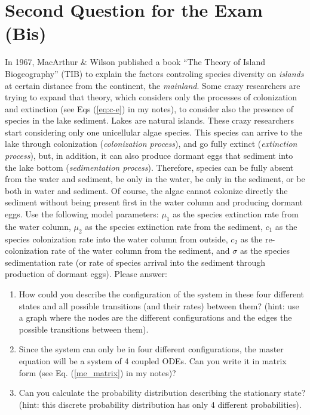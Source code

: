 \documentclass{article}
\begin{document}
\section{Second Question for the Exam (Bis)}
In 1967, MacArthur \& Wilson published a book ``The Theory of Island Biogeography'' (TIB) to explain the factors controling species diversity on {\em islands} at certain distance from the continent, the {\em mainland}. Some crazy researchers are trying to expand that theory, which considers only the processes of colonization and extinction (see Eqs (\ref{eq:c-e}) in my notes), to consider also the presence of species in the lake sediment. Lakes are natural islands. These crazy researchers start considering only one  unicellular algae species. This species can arrive to the lake through colonization (\textit{colonization process}), and go fully extinct (\textit{extinction process}), but, in addition, it can also produce dormant eggs that sediment into the lake bottom (\textit{sedimentation process}). Therefore, species can be fully absent from the water and sediment, be only in the water, be only in the sediment, or be both in water and sediment. Of course, the algae cannot colonize directly the sediment without being present first in the water column and producing dormant eggs. Use the following model parameters: $\mu_1$ as the species extinction rate from the water column, $\mu_2$ as the species extinction rate from the sediment, $c_1$ as the species colonization rate into the water column from outside, $c_2$ as the re-colonization rate of the water column from the sediment, and $\sigma$ as the species sedimentation rate (or rate of species arrival into the sediment through production of dormant eggs). Please answer: 

\begin{enumerate}
	\item How could you describe the configuration of the system in these four different states and all possible transitions (and their rates) between them? (hint: use a graph where the nodes are the different configurations and the edges the possible transitions between them).
	\item Since the system can only be in four different configurations, the master equation will be a system of 4 coupled ODEs. Can you write it in matrix form (see Eq. (\ref{me_matrix}) in my notes)?    
	\item Can you calculate the probability distribution describing the stationary state? (hint: this discrete probability distribution has only 4 different probabilities).
\end{enumerate}
\end{document}
